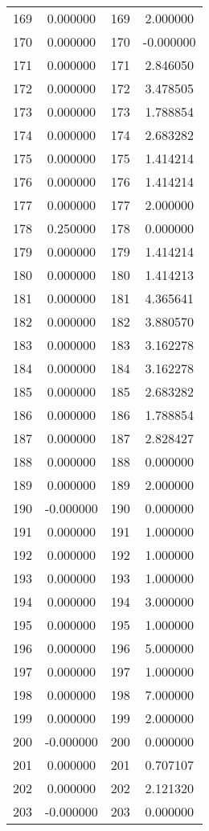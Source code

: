 \documentclass[12pt]{article}
\begin{document}
\begin{longtable}{@{}cccc@{}}
169 & 0.000000 & 169 & 2.000000 \\
170 & 0.000000 & 170 & -0.000000 \\
171 & 0.000000 & 171 & 2.846050 \\
172 & 0.000000 & 172 & 3.478505 \\
173 & 0.000000 & 173 & 1.788854 \\
174 & 0.000000 & 174 & 2.683282 \\
175 & 0.000000 & 175 & 1.414214 \\
176 & 0.000000 & 176 & 1.414214 \\
177 & 0.000000 & 177 & 2.000000 \\
178 & 0.250000 & 178 & 0.000000 \\
179 & 0.000000 & 179 & 1.414214 \\
180 & 0.000000 & 180 & 1.414213 \\
181 & 0.000000 & 181 & 4.365641 \\
182 & 0.000000 & 182 & 3.880570 \\
183 & 0.000000 & 183 & 3.162278 \\
184 & 0.000000 & 184 & 3.162278 \\
185 & 0.000000 & 185 & 2.683282 \\
186 & 0.000000 & 186 & 1.788854 \\
187 & 0.000000 & 187 & 2.828427 \\
188 & 0.000000 & 188 & 0.000000 \\
189 & 0.000000 & 189 & 2.000000 \\
190 & -0.000000 & 190 & 0.000000 \\
191 & 0.000000 & 191 & 1.000000 \\
192 & 0.000000 & 192 & 1.000000 \\
193 & 0.000000 & 193 & 1.000000 \\
194 & 0.000000 & 194 & 3.000000 \\
195 & 0.000000 & 195 & 1.000000 \\
196 & 0.000000 & 196 & 5.000000 \\
197 & 0.000000 & 197 & 1.000000 \\
198 & 0.000000 & 198 & 7.000000 \\
199 & 0.000000 & 199 & 2.000000 \\
200 & -0.000000 & 200 & 0.000000 \\
201 & 0.000000 & 201 & 0.707107 \\
202 & 0.000000 & 202 & 2.121320 \\
203 & -0.000000 & 203 & 0.000000 \\

\end{longtable}
\end{document}
